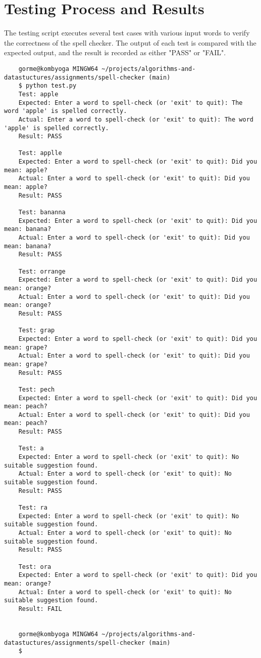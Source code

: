 \documentclass{article}
\begin{document}
\section*{Testing Process and Results}
The testing script executes several test cases with various input words to verify the correctness of the spell checker. The output of each test is compared with the expected output, and the result is recorded as either "PASS" or "FAIL".

\begin{verbatim}
    gorme@kombyoga MINGW64 ~/projects/algorithms-and-datastuctures/assignments/spell-checker (main)
    $ python test.py
    Test: apple
    Expected: Enter a word to spell-check (or 'exit' to quit): The word 'apple' is spelled correctly.
    Actual: Enter a word to spell-check (or 'exit' to quit): The word 'apple' is spelled correctly.
    Result: PASS
    
    Test: applle
    Expected: Enter a word to spell-check (or 'exit' to quit): Did you mean: apple?
    Actual: Enter a word to spell-check (or 'exit' to quit): Did you mean: apple?
    Result: PASS
    
    Test: bananna
    Expected: Enter a word to spell-check (or 'exit' to quit): Did you mean: banana?
    Actual: Enter a word to spell-check (or 'exit' to quit): Did you mean: banana?
    Result: PASS
    
    Test: orrange
    Expected: Enter a word to spell-check (or 'exit' to quit): Did you mean: orange?
    Actual: Enter a word to spell-check (or 'exit' to quit): Did you mean: orange?
    Result: PASS
    
    Test: grap
    Expected: Enter a word to spell-check (or 'exit' to quit): Did you mean: grape?
    Actual: Enter a word to spell-check (or 'exit' to quit): Did you mean: grape?
    Result: PASS
    
    Test: pech
    Expected: Enter a word to spell-check (or 'exit' to quit): Did you mean: peach?
    Actual: Enter a word to spell-check (or 'exit' to quit): Did you mean: peach?
    Result: PASS
    
    Test: a
    Expected: Enter a word to spell-check (or 'exit' to quit): No suitable suggestion found.
    Actual: Enter a word to spell-check (or 'exit' to quit): No suitable suggestion found.
    Result: PASS
    
    Test: ra
    Expected: Enter a word to spell-check (or 'exit' to quit): No suitable suggestion found.
    Actual: Enter a word to spell-check (or 'exit' to quit): No suitable suggestion found.
    Result: PASS
    
    Test: ora
    Expected: Enter a word to spell-check (or 'exit' to quit): Did you mean: orange?
    Actual: Enter a word to spell-check (or 'exit' to quit): No suitable suggestion found.
    Result: FAIL
    
    
    gorme@kombyoga MINGW64 ~/projects/algorithms-and-datastuctures/assignments/spell-checker (main)
    $
\end{verbatim}
\end{document}
